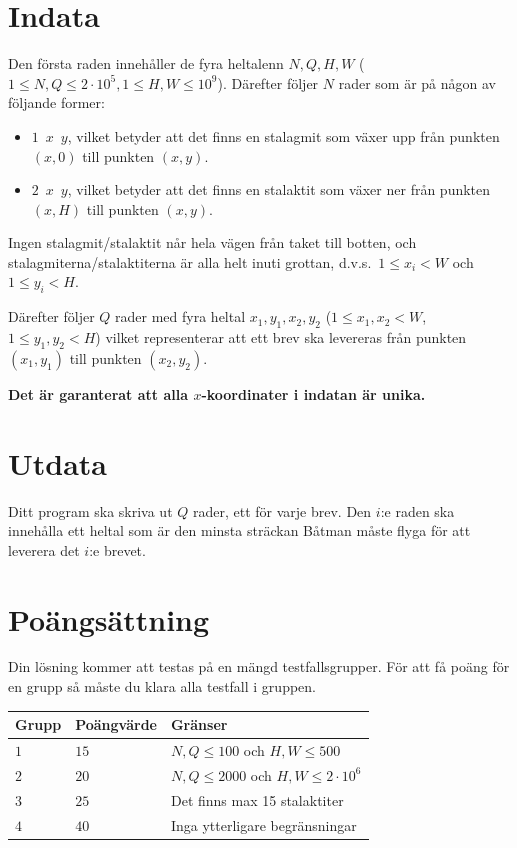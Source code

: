 \section*{Indata}
Den första raden innehåller de fyra heltalenn $N,Q,H,W$ ($1 \leq N, Q \leq 2 \cdot 10^5, 1 \leq H,W \leq 10^9$).
Därefter följer $N$ rader som är på någon av följande former:
\begin{itemize}
  \item $1\enspace x\enspace y$, vilket betyder att det finns en stalagmit
    som växer upp från punkten $(x,0)$ till punkten $(x,y)$.
  \item $2\enspace x\enspace y$, vilket betyder att det finns en stalaktit
    som växer ner från punkten $(x,H)$ till punkten $(x,y)$.
\end{itemize}
Ingen stalagmit/stalaktit når hela vägen från taket till botten,
och stalagmiterna/stalaktiterna är alla helt inuti grottan,
d.v.s.\ $1\le x_{i} < W$ och $1\le y_{i} < H$.

Därefter följer $Q$ rader med fyra heltal
$x_{1},y_{1},x_{2},y_{2}$ ($1\le x_{1},x_{2} < W$, $1\le y_{1},y_{2}< H$) vilket representerar att ett brev ska levereras från
punkten $(x_{1},y_{1})$ till punkten $(x_{2},y_{2})$.

\textbf{Det är garanterat att alla $x$-koordinater i indatan är unika.}

\section*{Utdata}
Ditt program ska skriva ut $Q$ rader, ett för varje brev.
Den $i$:e raden ska innehålla ett heltal som är den minsta
sträckan Båtman måste flyga för att leverera det $i$:e brevet.

\section*{Poängsättning}
Din lösning kommer att testas på en mängd testfallsgrupper.
För att få poäng för en grupp så måste du klara alla testfall i gruppen.

\noindent
\begin{tabular}{| l | l | l |}
\hline
Grupp & Poängvärde & Gränser \\ \hline
$1$    & $15$         & $N,Q\le 100$ och $H,W\le 500$ \\ \hline
$2$    & $20$         & $N,Q \le 2000$ och $H,W\le 2\cdot 10^6$\\ \hline
$3$    & $25$         & Det finns max 15 stalaktiter \\ \hline
$4$    & $40$         & Inga ytterligare begränsningar \\ \hline
\end{tabular}
